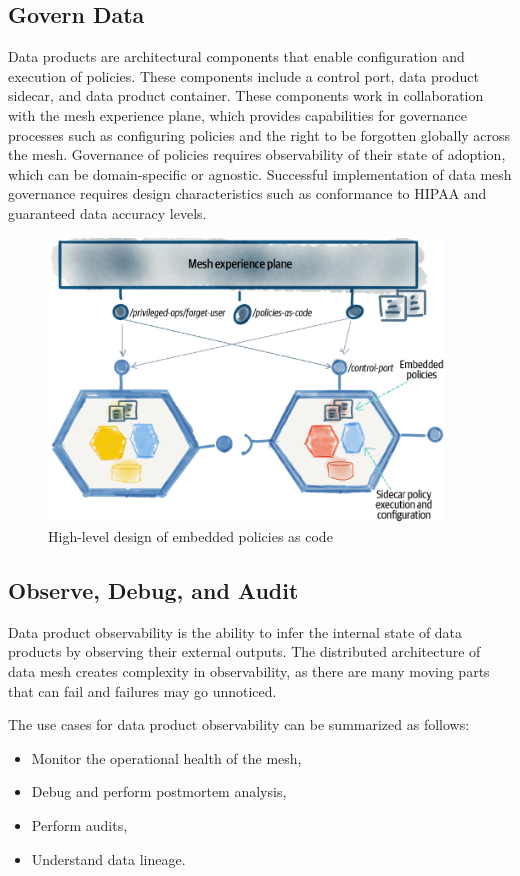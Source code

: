 \documentclass[12pt, a4paper]{book}
\begin{document}
\subsection{Govern Data}
Data products are architectural components that enable configuration and execution of policies. These components include a control port, data product sidecar, and data product container. These components work in collaboration with the mesh experience plane, which provides capabilities for governance processes such as configuring policies and the right to be forgotten globally across the mesh. Governance of policies requires observability of their state of adoption, which can be domain-specific or agnostic. Successful implementation of data mesh governance requires design characteristics such as conformance to HIPAA and guaranteed data accuracy levels.

\begin{figure}[ht]
	\begin{framed}
		\centering
		\includegraphics[width=10.5cm]{GovernData.png}
		\caption{High-level design of embedded policies as code}
		\label{GovernData}
	\end{framed}
	\vspace{-.8cm}
\end{figure}

\subsection{Observe, Debug, and Audit}
Data product observability is the ability to infer the internal state of data products by observing their external outputs. The distributed architecture of data mesh creates complexity in observability, as there are many moving parts that can fail and failures may go unnoticed.

The use cases for data product observability can be summarized as follows:
	\begin{itemize}[nosep]
		\item Monitor the operational health of the mesh,
		\item Debug and perform postmortem analysis,
		\item Perform audits,
		\item Understand data lineage.
	\end{itemize}
\end{document}
